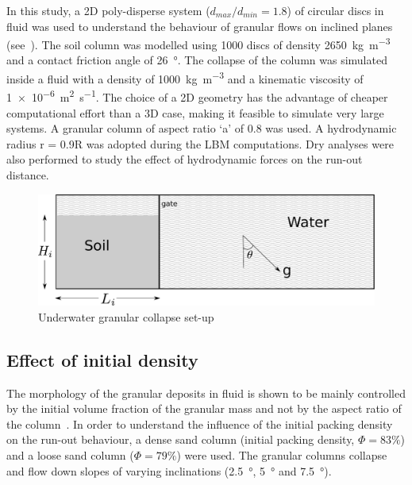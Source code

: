 In this study, a 2D poly-disperse system ($d_{max}/d_{min} = 1.8$) of circular discs in fluid was used to understand the behaviour of granular flows on inclined planes (see~). The soil column was modelled using 1000 discs of density \SI{2650}{\kg\per\cubic\meter} and a contact friction angle of \SI{26}{\degree}. The collapse of the column was simulated inside a fluid with a density of \SI{1000}{\kg\per\cubic\meter}  and a kinematic viscosity of \SI{1e-6}{\square\meter\per\second}. The choice of a 2D geometry has the advantage of cheaper computational effort than a 3D case, making it feasible to simulate very large systems. A granular column of aspect ratio `a' of 0.8 was used. A hydrodynamic radius r = 0.9R was adopted during the LBM computations. Dry analyses were also performed to study the effect of hydrodynamic forces on the run-out distance.

\begin{figure}[htpb]
\includegraphics[width=0.97\columnwidth]{geometry}
\caption{Underwater granular collapse set-up}
\label{fig:setup}
\end{figure}

\subsection{Effect of initial density}
The morphology of the granular deposits in fluid is shown to be mainly controlled by the initial volume fraction of the granular mass and not by the aspect ratio of the column~\citep{Rondon2011,Pailha2008}. In order to understand the influence of the initial packing density on the run-out behaviour, a dense sand column (initial packing density, $\Phi=83\%$) and a loose sand column ($\Phi=79\%$) were used. The granular columns collapse and flow down slopes of varying inclinations (\SI{2.5}{\degree}, \SI{5}{\degree} and \SI{7.5}{\degree}).

